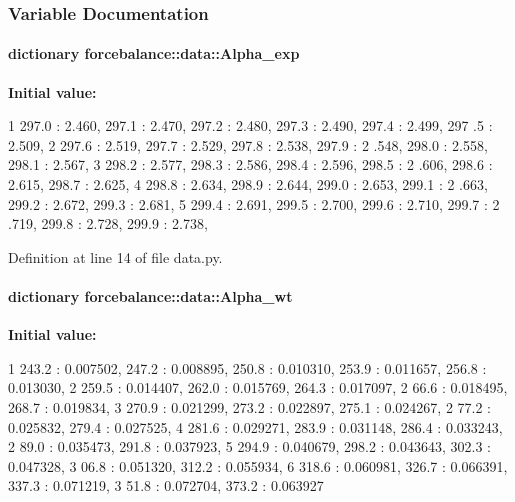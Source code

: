 \subsubsection{\-Variable \-Documentation}
\hypertarget{namespaceforcebalance_1_1data_aa22aaf25066bf8d28b16de90a229ab14}{
\paragraph[{\-Alpha\-\_\-exp}]{\setlength{\rightskip}{0pt plus 5cm}dictionary {\bf forcebalance\-::data\-::\-Alpha\-\_\-exp}}}\label{namespaceforcebalance_1_1data_aa22aaf25066bf8d28b16de90a229ab14}
{\bfseries \-Initial value\-:}
\begin{DoxyCode}
1 {297.0 : 2.460, 297.1 : 2.470, 297.2 : 2.480, 297.3 : 2.490, 297.4 : 2.499, 297
      .5 : 2.509,
2                          297.6 : 2.519, 297.7 : 2.529, 297.8 : 2.538, 297.9 : 2
      .548, 298.0 : 2.558, 298.1 : 2.567,
3                          298.2 : 2.577, 298.3 : 2.586, 298.4 : 2.596, 298.5 : 2
      .606, 298.6 : 2.615, 298.7 : 2.625,
4                          298.8 : 2.634, 298.9 : 2.644, 299.0 : 2.653, 299.1 : 2
      .663, 299.2 : 2.672, 299.3 : 2.681,
5                          299.4 : 2.691, 299.5 : 2.700, 299.6 : 2.710, 299.7 : 2
      .719, 299.8 : 2.728, 299.9 : 2.738, }
\end{DoxyCode}


\-Definition at line 14 of file data.\-py.

\hypertarget{namespaceforcebalance_1_1data_ac28ea53dfde9bd9108ff2b1d5205c454}{
\paragraph[{\-Alpha\-\_\-wt}]{\setlength{\rightskip}{0pt plus 5cm}dictionary {\bf forcebalance\-::data\-::\-Alpha\-\_\-wt}}}\label{namespaceforcebalance_1_1data_ac28ea53dfde9bd9108ff2b1d5205c454}
{\bfseries \-Initial value\-:}
\begin{DoxyCode}
1 {243.2 : 0.007502, 247.2 : 0.008895, 250.8 : 0.010310, 253.9 : 0.011657, 256.8 
      : 0.013030, 
2                         259.5 : 0.014407, 262.0 : 0.015769, 264.3 : 0.017097, 2
      66.6 : 0.018495, 268.7 : 0.019834, 
3                         270.9 : 0.021299, 273.2 : 0.022897, 275.1 : 0.024267, 2
      77.2 : 0.025832, 279.4 : 0.027525, 
4                         281.6 : 0.029271, 283.9 : 0.031148, 286.4 : 0.033243, 2
      89.0 : 0.035473, 291.8 : 0.037923, 
5                         294.9 : 0.040679, 298.2 : 0.043643, 302.3 : 0.047328, 3
      06.8 : 0.051320, 312.2 : 0.055934, 
6                         318.6 : 0.060981, 326.7 : 0.066391, 337.3 : 0.071219, 3
      51.8 : 0.072704, 373.2 : 0.063927}
\end{DoxyCode}


